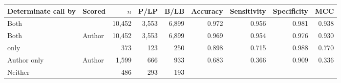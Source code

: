 \begin{tabular}{llrrrrrrr}
\toprule
Determinate call by & Scored & $n$ & P/LP & B/LB & Accuracy & Sensitivity & Specificity & MCC \\
\midrule
Both & \excalibr{} & 10,452 & 3,553 & 6,899 & 0.972 & 0.956 & 0.981 & 0.938 \\
Both & Author & 10,452 & 3,553 & 6,899 & 0.969 & 0.954 & 0.976 & 0.930 \\
\excalibr{} only & \excalibr{} & 373 & 123 & 250 & 0.898 & 0.715 & 0.988 & 0.770 \\
Author only & Author & 1,599 & 666 & 933 & 0.683 & 0.366 & 0.909 & 0.336 \\
Neither & -- & 486 & 293 & 193 & -- & -- & -- & -- \\
\bottomrule
\end{tabular}
